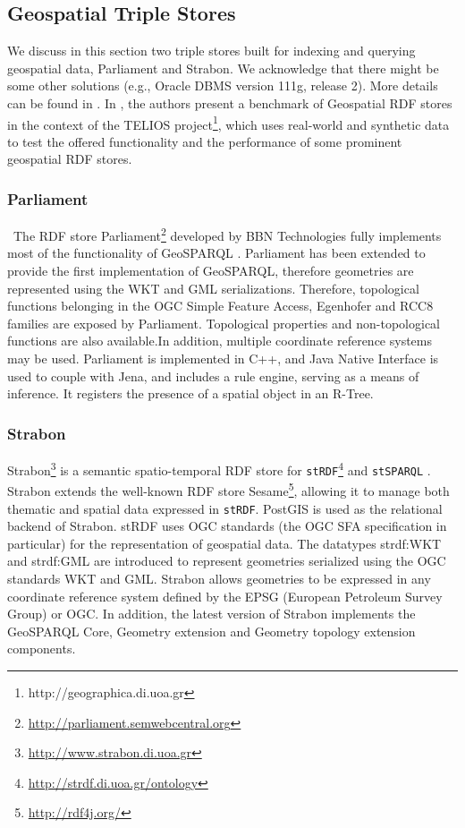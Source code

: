 \subsection{Geospatial Triple Stores}
\label{sec:geotps}
We discuss in this section two triple stores built for indexing and querying geospatial data, Parliament and Strabon. We acknowledge that there might be some other solutions (e.g., Oracle DBMS version 111g, release 2). More details can be found in \cite{koubarakis12, battle12, garbis13}. In \cite{garbis13}, the authors present a benchmark of Geospatial RDF stores in the context of the TELIOS project\footnote{http://geographica.di.uoa.gr}, which uses real-world and synthetic data to test the offered functionality and the performance of some prominent geospatial RDF stores.

\subsubsection{Parliament}
\
The RDF store Parliament\footnote{\url{http://parliament.semwebcentral.org}} developed by BBN Technologies fully implements most of the functionality of GeoSPARQL \cite{battle12}.
Parliament has been extended to provide the first implementation of GeoSPARQL, therefore geometries are represented using the WKT and GML serializations.
Therefore, topological functions belonging in the OGC Simple Feature Access, Egenhofer and RCC8 families are exposed by Parliament.
Topological properties and non-topological functions are also available.In addition, multiple coordinate reference systems may be used. Parliament is implemented in C++, and Java Native Interface is used to couple with Jena, and includes a rule engine, serving as a means of inference. It registers the presence of a spatial object in an R-Tree.

\subsubsection{Strabon}
Strabon\footnote{\url{http://www.strabon.di.uoa.gr}} is a semantic spatio-temporal RDF store for \texttt{stRDF}\footnote{\url{http://strdf.di.uoa.gr/ontology}} and \texttt{stSPARQL} \cite{strabon12}. Strabon extends the well-known RDF store Sesame\footnote{\url{http://rdf4j.org/}}, allowing it to manage both thematic and spatial data expressed in \texttt{stRDF}. PostGIS is used as the relational backend of Strabon.
stRDF uses OGC standards (the OGC SFA specification in particular) for the representation of geospatial data.
The datatypes strdf:WKT and strdf:GML are introduced to represent geometries serialized using the OGC standards WKT and GML. Strabon allows geometries to be expressed in any coordinate reference system defined by the EPSG (European Petroleum Survey Group) or OGC. In addition, the latest version of Strabon implements the GeoSPARQL Core, Geometry extension and Geometry topology extension components.


